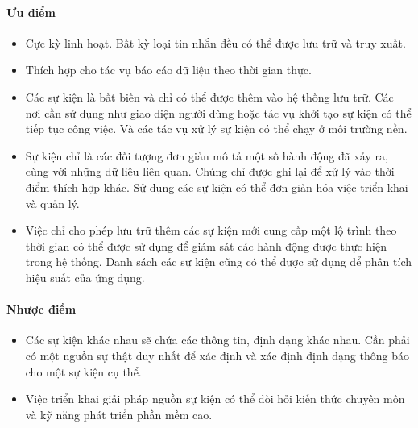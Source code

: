 \paragraph{Ưu điểm}

\begin{itemize}
    \item Cực kỳ linh hoạt. Bất kỳ loại tin nhắn đều có thể được lưu trữ và truy xuất.
    \item Thích hợp cho tác vụ báo cáo dữ liệu theo thời gian thực.
    \item Các sự kiện là bất biến và chỉ có thể được thêm vào hệ thống lưu trữ. Các nơi cần sử dụng như giao diện người dùng hoặc tác vụ khởi tạo sự kiện có thể tiếp tục công việc. Và các tác vụ xử lý sự kiện có thể chạy ở môi trường nền.
    \item Sự kiện chỉ là các đối tượng đơn giản mô tả một số hành động đã xảy ra, cùng với những dữ liệu liên quan. Chúng chỉ được ghi lại để xử lý vào thời điểm thích hợp khác. Sử dụng các sự kiện có thể đơn giản hóa việc triển khai và quản lý.
    \item Việc chỉ cho phép lưu trữ thêm các sự kiện mới cung cấp một lộ trình theo thời gian có thể được sử dụng để giám sát các hành động được thực hiện trong hệ thống. Danh sách các sự kiện cũng có thể được sử dụng để phân tích hiệu suất của ứng dụng.
\end{itemize}

\paragraph{Nhược điểm}

\begin{itemize}
    \item Các sự kiện khác nhau sẽ chứa các thông tin, định dạng khác nhau. Cần phải có một nguồn sự thật duy nhất để xác định và xác định định dạng thông báo cho một sự kiện cụ thể.
    \item Việc triển khai giải pháp nguồn sự kiện có thể đòi hỏi kiến thức chuyên môn và kỹ năng phát triển phần mềm cao.
\end{itemize}
